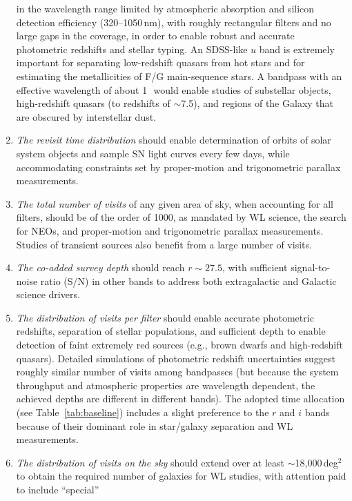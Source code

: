\begin{enumerate}
    in the wavelength range limited by atmospheric absorption and
    silicon detection efficiency (320--1050\,nm), with roughly
    rectangular filters and no large gaps in the coverage, in order
    to enable robust and accurate photometric redshifts and stellar typing. An
    SDSS-like $u$ band \citep{1996AJ....111.1748F} is extremely important for separating
    low-redshift quasars from hot stars and for estimating the metallicities of
    F/G main-sequence stars. A bandpass with an effective wavelength of
    about 1\,\micron\ would enable studies of substellar objects, high-redshift
    quasars (to redshifts of $\sim$7.5), and regions of the Galaxy that are obscured
    by interstellar dust.
\item  \emph{The revisit time distribution} should enable determination of
   orbits of solar system objects and sample SN light curves every few days,
   while accommodating constraints set by proper-motion and trigonometric
   parallax measurements.
\item  \emph{The total number of visits} of any given area of sky, when accounting for all
   filters, should be of the order of 1000, as mandated by WL
   science, the search for NEOs, and proper-motion and
   trigonometric parallax measurements. Studies of transient sources
   also benefit from a large number of visits.
\item  \emph{The co-added survey depth} should reach
    $r\sim27.5$, with sufficient signal-to-noise ratio (S/N) in other bands
    to address both extragalactic and Galactic science drivers.
\item  \emph{The distribution of visits per filter} should enable
   accurate photometric redshifts, separation of stellar populations,
   and sufficient depth to enable detection of faint extremely red
   sources (e.g., brown dwarfs and high-redshift quasars). Detailed simulations of
   photometric redshift uncertainties
   suggest roughly similar number of visits among bandpasses
   (but because the system throughput and atmospheric properties are
    wavelength dependent, the achieved depths are different in different
    bands). The adopted time allocation
   (see Table~\ref{tab:baseline}) includes a slight preference to the $r$ and $i$ bands because of their
   dominant role in star/galaxy separation and WL measurements.
\item  \emph{The distribution of visits on the sky} should extend over
   at least $\sim$18,000\,deg$^2$ to obtain the required number of galaxies
   for WL studies, with attention paid to include ``special''

\end{enumerate}
